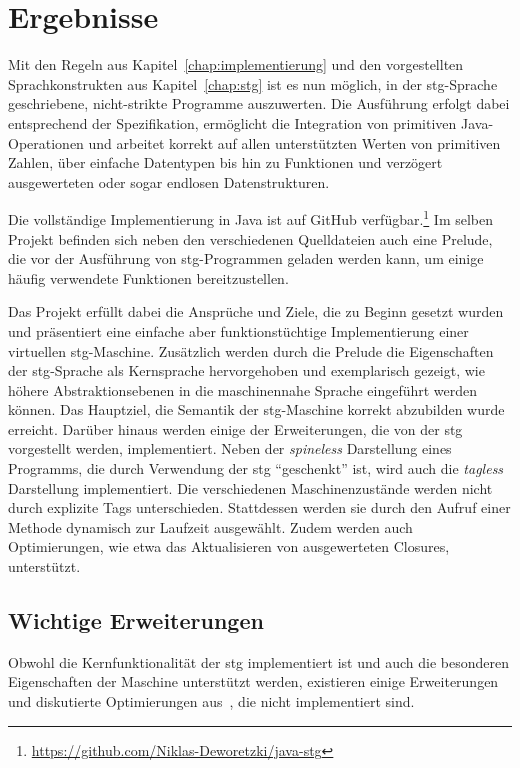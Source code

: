 
\chapter{Ergebnisse}\label{chap:ergebnisse}

Mit den Regeln aus Kapitel~\ref{chap:implementierung} und den vorgestellten Sprachkonstrukten aus Kapitel~\ref{chap:stg} ist es nun möglich, in der \gls{stg}-Sprache geschriebene, nicht-strikte Programme auszuwerten.
Die Ausführung erfolgt dabei entsprechend der Spezifikation, ermöglicht die Integration von primitiven Java-Operationen und arbeitet korrekt auf allen unterstützten Werten von primitiven Zahlen, über einfache Datentypen bis hin zu Funktionen und verzögert ausgewerteten oder sogar endlosen Datenstrukturen.

Die vollständige Implementierung in Java ist auf GitHub verfügbar.\footnote{\url{https://github.com/Niklas-Deworetzki/java-stg}}
Im selben Projekt befinden sich neben den verschiedenen Quelldateien auch eine Prelude, die vor der Ausführung von \gls{stg}-Programmen geladen werden kann, um einige häufig verwendete Funktionen bereitzustellen.

Das Projekt erfüllt dabei die Ansprüche und Ziele, die zu Beginn gesetzt wurden und präsentiert eine einfache aber funktionstüchtige Implementierung einer virtuellen \gls{stg}-Maschine.
Zusätzlich werden durch die Prelude die Eigenschaften der \gls{stg}-Sprache als Kernsprache hervorgehoben und exemplarisch gezeigt, wie höhere Abstraktionsebenen in die maschinennahe Sprache eingeführt werden können.
Das Hauptziel, die Semantik der \gls{stg}-Maschine korrekt abzubilden wurde erreicht.
Darüber hinaus werden einige der Erweiterungen, die von der \gls{stg} vorgestellt werden, implementiert.
Neben der \textit{spineless} Darstellung eines Programms, die durch Verwendung der \gls{stg} \enquote{geschenkt} ist, wird auch die \textit{tagless} Darstellung implementiert.
Die verschiedenen Maschinenzustände werden nicht durch explizite Tags unterschieden.
Stattdessen werden sie durch den Aufruf einer Methode dynamisch zur Laufzeit ausgewählt.
Zudem werden auch Optimierungen, wie etwa das Aktualisieren von ausgewerteten Closures, unterstützt.

\section{Wichtige Erweiterungen}

Obwohl die Kernfunktionalität der \gls{stg} implementiert ist und auch die besonderen Eigenschaften der Maschine unterstützt werden, existieren einige Erweiterungen und diskutierte Optimierungen aus~\cite{Jones_StockHardwareSTG}, die nicht implementiert sind.

